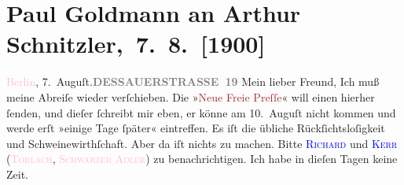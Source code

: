 

         
         \renewcommand{\erwaehntePersonen}{Personen:  ?? [Urlaubsvertretung von Paul Goldmann, 2. Augusthälfte 1900], Richard Beer-Hofmann, Georg Brandes, Alfred Kerr}
         \renewcommand{\erwaehnteInstitutionen}{Institutionen: Neue Freie Presse}
         \renewcommand{\erwaehnteOrte}{Orte: Bad Ischl, Berlin, Dessauer Straße, Schwarzer Adler, Toblach}
         \renewcommand{\erwaehnteWerke}{}
               \section[ Paul Goldmann an Arthur Schnitzler, 7. 8. {[}1900{]}]{Paul Goldmann an Arthur Schnitzler, 7. 8. {[}1900{]}}\nopagebreak{}\rehead{ }\normalsize\beginnumbering{} \toendnotes[C]{\smallbreak\pagebreak[2]} 
\toendnotes[C]{\smallbreak}\pstart
           \noindent{}{\pb}\textcolor{pink}{Berlin}{}\ledrightnote{\textcolor{pink}{Berlin}}, 7. Auguſt.\hfill \textcolor{pink}{\textcolor{gray}{\textbf{DESSAUERSTRASSE 19}}}{}\ledrightnote{\textcolor{pink}{Dessauer Straße}}\pend
           \pstart
           \centering{}Mein lieber Freund,\pend
           \pstart
           \noindent{}Ich muß meine Abreiſe wieder verſchieben. Die »\textcolor{brown}{Neue
               Freie Preſſe}{}\ledrightnote{\textcolor{brown}{Neue Freie Presse}}« will einen \label{K_L02927-1v}\label{K_L02927-1h}
               hierher ſenden, und dieſer ſchreibt mir eben, er könne am 10. Auguſt nicht kommen und werde erſt »einige Tage ſpäter« eintreffen.
                   Es iſt die  übliche Rückſichtsloſigkeit und Schweinewirthſchaft. Aber da iſt nichts zu
               machen. {\pb}Bitte \textsc{\textcolor{blue}{Richard}{}\ledrightnote{\textcolor{blue}{Richard Beer-Hofmann}}} und \textsc{\textcolor{blue}{Kerr}{}\ledrightnote{\textcolor{blue}{Alfred Kerr}}} (\textsc{\textcolor{pink}{Toblach}{}\ledrightnote{\textcolor{pink}{Toblach}}}, \textsc{\textcolor{pink}{Schwarzer Adler}{}\ledrightnote{\textcolor{pink}{Schwarzer Adler}}}) zu benachrichtigen. Ich habe in dieſen Tagen keine Zeit.\pend
